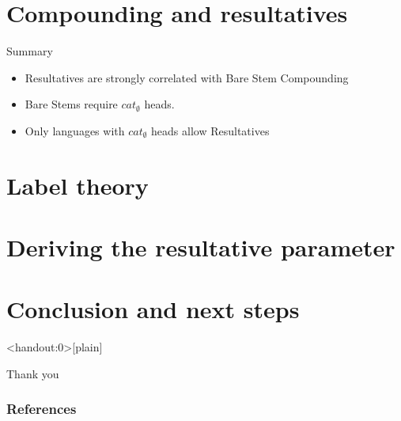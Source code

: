\documentclass[Proposal]{subfiles}
\begin{document}
\section{Compounding and resultatives}

\begin{frame}
  {Summary}

  \begin{itemize}
    \item Resultatives are strongly correlated with Bare Stem Compounding
    \item Bare Stems require $cat_\emptyset$ heads.
    \item Only languages with $cat_\emptyset$ heads allow Resultatives
  \end{itemize}
\end{frame}
\section{Label theory}

\section{Deriving the resultative parameter}

\section{Conclusion and next steps}

\begin{frame}<handout:0>[plain]
  \begin{center}
    {\Huge Thank you}
  \end{center}
\end{frame}
\begin{frame}[t,allowframebreaks]
  \frametitle{References}
  \printbibliography
\end{frame}
\end{document}
